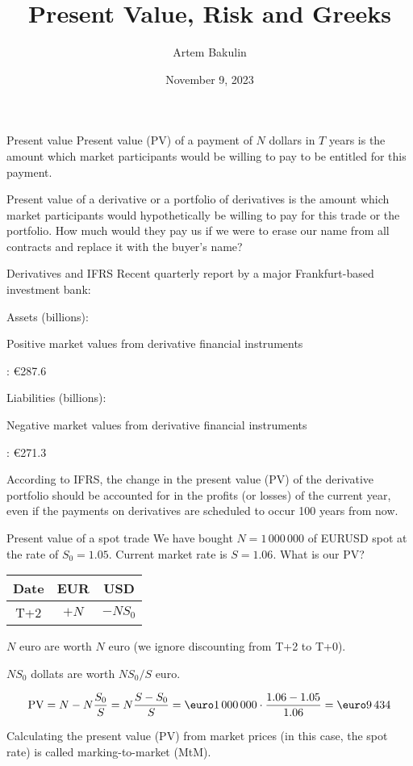 \documentclass{beamer}
\title{Present Value, Risk and Greeks}
\author{Artem Bakulin}
\date{November 9, 2023}
\renewcommand{\EUR}[1]{\textup{\euro}#1}
\newcommand{\en}[1]{\begin{otherlanguage}{english}#1\end{otherlanguage}}
\begin{document}
\begin{frame}
\titlepage
\end{frame}



\begin{frame}{Present value}
\justify
\alert{Present value (PV)} of a payment of $N$ dollars in $T$ years is the amount which market participants would be willing to pay to be entitled for this payment.

\justify
\alert{Present value} of a derivative or a portfolio of derivatives is the amount which market participants would hypothetically be willing to pay for this trade or the portfolio. How much would they pay us if we were to erase our name from all contracts and replace it with the buyer's name?

\end{frame}



\begin{frame}{Derivatives and IFRS}
\justify
Recent quarterly report by a major Frankfurt-based investment bank:

\justify
Assets (billions):

\en{Positive market values from derivative financial instruments}: \EUR{287.6}

\justify
Liabilities (billions):

\en{Negative market values from derivative financial instruments}: \EUR{271.3}

\justify
According to IFRS, the change in the present value (PV) of the derivative portfolio should be accounted for in the profits (or losses) of the current year, even if the payments on derivatives are scheduled to occur 100 years from now.
\end{frame}



\begin{frame}{Present value of a spot trade}
\justify
We have bought $N=1\,000\,000$ of EURUSD spot at the rate of $S_0 = 1.05$. Current market rate is $S=1.06$. What is our PV?

\justify
\centering
\begin{tabular}{c|c|c}
Date & EUR  & USD \\ \hline
T+2 & $+N$ & $-NS_0$
\end{tabular}

\justify
$N$ euro are worth $N$ euro (we ignore discounting from T+2 to T+0).

\justify
$NS_0$ dollats are worth $NS_0/S$ euro.

\begin{align*}
\text{PV} = N - N\frac{S_0}{S} = N\frac{S - S_0}{S} = \EUR{1\,000\,000} \cdot \frac{1.06 - 1.05}{1.06} = \EUR{9\,434}
\end{align*}

\justify
Calculating the present value (PV) from market prices (in this case, the spot rate) is called \alert{marking-to-market (MtM)}.
\end{frame}
\end{document}
